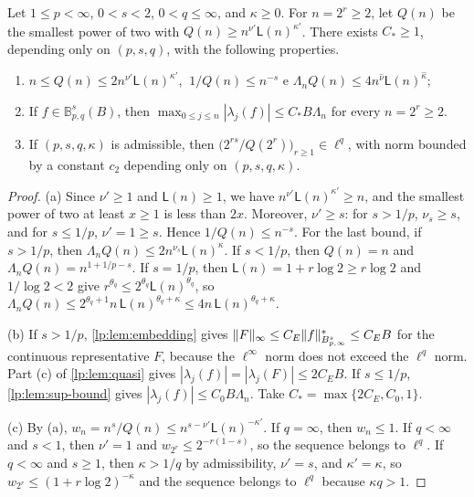 \documentclass[11pt,a4paper]{article}
\begin{document}
\begin{lema}
\label{lp:lem:uniform-height}
Let $1\le p<\infty$, $0<s<2$, $0<q\le\infty$, and $\kappa\ge0$. For $n=2^r\ge2$, let $Q(n)$ be the smallest power of two with $Q(n)\ge n^{\nu'}\mathsf L(n)^{\kappa'}$. There exists $C_*\ge1$, depending only on $(p,s,q)$, with the following properties.
\begin{enumerate}[label=(\alph*)]
 \item $n\le Q(n)\le2n^{\nu'}\mathsf L(n)^{\kappa'}$, $\ 1/Q(n)\le n^{-s}$ e $\Lambda_nQ(n)\le4n^{\hat\nu}\mathsf L(n)^{\hat\kappa}$;
 \item If $f\in\mathbb B^s_{p,q}(B)$, then $\max_{0\le j\le n}|\lambda_j(f)|\le C_*B\Lambda_n$ for every $n=2^r\ge2$.
 \item If $(p,s,q,\kappa)$ is admissible, then $\big(2^{rs}/Q(2^r)\big)_{r\ge1}\in\ell^q$, with norm bounded by a constant $c_2$ depending only on $(p,s,q,\kappa)$.
\end{enumerate}
\end{lema}

\begin{proof}
(a) Since $\nu'\ge1$ and $\mathsf L(n)\ge1$, we have $n^{\nu'}\mathsf L(n)^{\kappa'}\ge n$, and the smallest power of two at least $x\ge1$ is less than $2x$. Moreover, $\nu'\ge s$: for $s>1/p$, $\nu_s\ge s$, and for $s\le1/p$, $\nu'=1\ge s$. Hence $1/Q(n)\le n^{-s}$. For the last bound, if $s>1/p$, then $\Lambda_nQ(n)\le2n^{\nu_s}\mathsf L(n)^\kappa$. If $s<1/p$, then $Q(n)=n$ and $\Lambda_nQ(n)=n^{1+1/p-s}$. If $s=1/p$, then $\mathsf L(n)=1+r\log2\ge r\log2$ and $1/\log2<2$ give $r^{\theta_q}\le2^{\theta_q}\mathsf L(n)^{\theta_q}$, so $\Lambda_nQ(n)\le2^{\theta_q+1}n\,\mathsf L(n)^{\theta_q+\kappa}\le4n\,\mathsf L(n)^{\theta_q+\kappa}$.

(b) If $s>1/p$, \cref{lp:lem:embedding} gives $\|F\|_\infty\le C_E\|f\|^*_{B^{s}_{p,\infty}}\le C_EB$ for the continuous representative $F$, because the $\ell^\infty$ norm does not exceed the $\ell^q$ norm. Part (c) of \cref{lp:lem:quasi} gives $|\lambda_j(f)|=|\lambda_j(F)|\le2C_EB$. If $s\le1/p$, \cref{lp:lem:sup-bound} gives $|\lambda_j(f)|\le C_0B\Lambda_n$. Take $C_*=\max\{2C_E,C_0,1\}$.

(c) By (a), $w_n=n^s/Q(n)\le n^{s-\nu'}\mathsf L(n)^{-\kappa'}$. If $q=\infty$, then $w_n\le1$. If $q<\infty$ and $s<1$, then $\nu'=1$ and $w_{2^r}\le2^{-r(1-s)}$, so the sequence belongs to $\ell^q$. If $q<\infty$ and $s\ge1$, then $\kappa>1/q$ by admissibility, $\nu'=s$, and $\kappa'=\kappa$, so $w_{2^r}\le(1+r\log2)^{-\kappa}$ and the sequence belongs to $\ell^q$ because $\kappa q>1$.
\end{proof}
\end{document}
